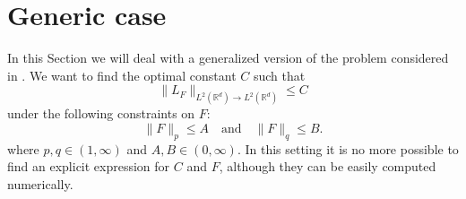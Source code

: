 \documentclass[corpo=11pt, stile=classica, tipotesi=custom,
greek, evenboxes, english]{toptesi}
\numberwithin{equation}{chapter}
\newcommand{\R}{\mathbb{R}} %
\begin{document}
\section{Generic case}
In this Section we will deal with a generalized version of the problem considered in \cite{nicolatilli_norm}. We want to find the optimal constant $C$ such that
\begin{equation*}
	\| L_F \|_{L^2(\R^d) \rightarrow L^2(\R^d)} \leq C
\end{equation*}
under the following constraints on $F$:
\begin{equation}\label{constraints generic case}
	\|F \|_p \leq A \quad \text{and} \quad \|F\|_q \leq B.
\end{equation}
where $p,q \in (1,\infty)$ and $A,B \in (0,\infty)$. In this setting it is no more possible to find an explicit expression for $C$ and $F$, {\color{red} although they can be easily computed numerically.}
\end{document}
